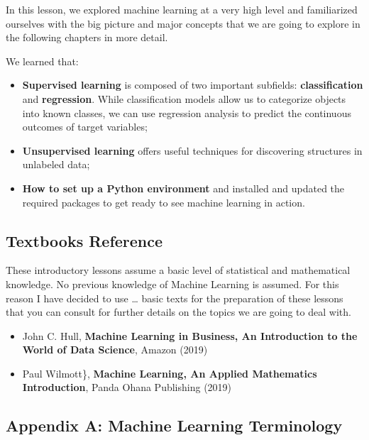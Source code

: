 \documentclass[11pt]{article}
\begin{document}
In this lesson, we explored machine learning at a very high level and
familiarized ourselves with the big picture and major concepts that we
are going to explore in the following chapters in more detail.

We learned that:

\begin{itemize}
\item
  \textbf{Supervised learning} is composed of two important subfields:
  \textbf{classification} and \textbf{regression}. While classification
  models allow us to categorize objects into known classes, we can use
  regression analysis to predict the continuous outcomes of target
  variables;
\item
  \textbf{Unsupervised learning} offers useful techniques for
  discovering structures in unlabeled data;
\item
  \textbf{How to set up a Python environment} and installed and updated
  the required packages to get ready to see machine learning in action.
\end{itemize}

    \hypertarget{textbooks-reference}{%
\subsection{Textbooks Reference}\label{textbooks-reference}}

These introductory lessons assume a basic level of statistical and
mathematical knowledge. No previous knowledge of Machine Learning is
assumed. For this reason I have decided to use \ldots{} basic texts for
the preparation of these lessons that you can consult for further
details on the topics we are going to deal with.

\begin{itemize}
\item
  John C. Hull, \textbf{Machine Learning in Business, An Introduction to
  the World of Data Science}, Amazon (2019)
\item
  Paul Wilmott\}, \textbf{Machine Learning, An Applied Mathematics
  Introduction}, Panda Ohana Publishing (2019)
\end{itemize}

    \hypertarget{appendix-a-machine-learning-terminology}{%
\subsection{Appendix A: Machine Learning
Terminology}\label{appendix-a-machine-learning-terminology}}
\end{document}
